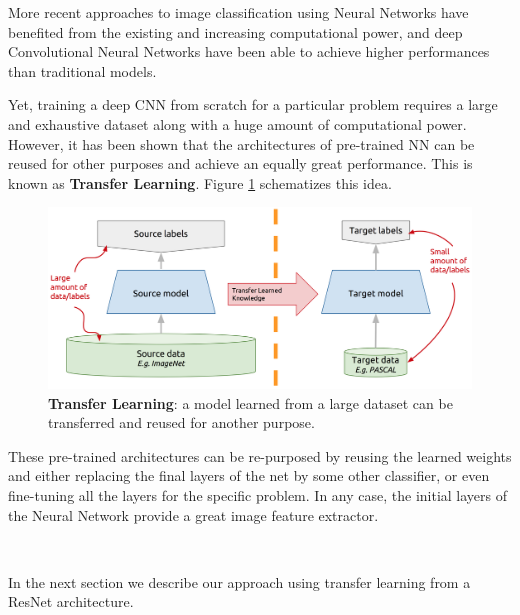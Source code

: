 More recent approaches to image classification using Neural Networks have benefited from the existing and increasing computational power, and deep Convolutional Neural Networks have been able to achieve higher performances than traditional models. 

Yet, training a deep CNN from scratch for a particular problem requires a large and exhaustive dataset along with a huge amount of computational power. However, it has been shown that the architectures of pre-trained NN can be reused for other purposes and achieve an equally great performance. This is known as \textbf{Transfer Learning}. Figure \ref{fig:transfer_learning_idea} schematizes this idea.

\begin{figure}[h!]
	\centering
	\captionsetup{width=1\linewidth}
	\includegraphics[width=1\textwidth]{Figures/transfer_learning_idea.png}
	\caption{\textbf{Transfer Learning}: a model learned from a large dataset can be transferred and reused for another purpose. \parencite{McGuinness2017}}
	\label{fig:transfer_learning_idea}
\end{figure}

These pre-trained architectures can be re-purposed by reusing the learned weights and either replacing the final layers of the net by some other classifier, or even fine-tuning all the layers for the specific problem. In any case, the initial layers of the Neural Network provide a great image feature extractor.

\

In the next section we describe our approach using transfer learning from a ResNet architecture.


